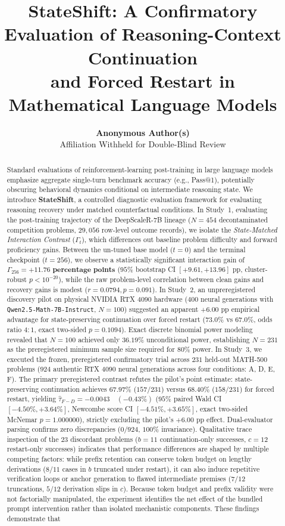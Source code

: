 \documentclass[11pt]{article}
\title{\textbf{StateShift: A Confirmatory Evaluation of Reasoning-Context Continuation\\and Forced Restart in Mathematical Language Models}}
\author{
  \textbf{Anonymous Author(s)} \\
  Affiliation Withheld for Double-Blind Review \\
}
\date{}
\begin{document}
\maketitle

\begin{abstract}
Standard evaluations of reinforcement-learning post-training in large language models emphasize aggregate single-turn benchmark accuracy (e.g., Pass@1), potentially obscuring behavioral dynamics conditional on intermediate reasoning state. We introduce \textbf{StateShift}, a controlled diagnostic evaluation framework for evaluating reasoning recovery under matched counterfactual conditions. In Study~1, evaluating the post-training trajectory of the DeepScaleR-7B lineage ($N=454$ decontaminated competition problems, $29,056$ row-level outcome records), we isolate the \emph{State-Matched Interaction Contrast} ($\Gamma_t$), which differences out baseline problem difficulty and forward proficiency gains. Between the un-tuned base model ($t=0$) and the terminal checkpoint ($t=256$), we observe a statistically significant interaction gain of $\Gamma_{256} = \mathbf{+11.76\text{ percentage points}}$ ($95\%$ bootstrap CI $[+9.61, +13.96]\text{ pp}$, cluster-robust $p < 10^{-20}$), while the raw problem-level correlation between clean gains and recovery gains is modest ($r = 0.0794, p = 0.091$). In Study~2, an unpreregistered discovery pilot on physical NVIDIA RTX 4090 hardware ($400$ neural generations with \texttt{Qwen2.5-Math-7B-Instruct}, $N=100$) suggested an apparent $+6.00\text{ pp}$ empirical advantage for state-preserving continuation over forced restart ($73.0\%$ vs $67.0\%$, odds ratio $4:1$, exact two-sided $p = 0.1094$). Exact discrete binomial power modeling revealed that $N=100$ achieved only $36.19\%$ unconditional power, establishing $N=231$ as the preregistered minimum sample size required for $80\%$ power. In Study~3, we executed the frozen, preregistered confirmatory trial across $231$ held-out MATH-500 problems ($924$ authentic RTX 4090 neural generations across four conditions: A, D, E, F). The primary preregistered contrast refutes the pilot's point estimate: state-preserving continuation achieves $67.97\%$ ($157/231$) versus $68.40\%$ ($158/231$) for forced restart, yielding $\hat{\tau}_{F-D} = \mathbf{-0.0043 \quad (-0.43\%)}$ ($95\%$ paired Wald CI $[-4.50\%, +3.64\%]$, Newcombe score CI $[-4.51\%, +3.65\%]$, exact two-sided McNemar $p = \mathbf{1.000000}$), strictly excluding the pilot's $+6.00\text{ pp}$ effect. Dual-evaluator parsing confirms zero discrepancies ($0/924$, $100\%$ invariance). Qualitative trace inspection of the $23$ discordant problems ($b=11$ continuation-only successes, $c=12$ restart-only successes) indicates that performance differences are shaped by multiple competing factors: while prefix retention can conserve token budget on lengthy derivations ($8/11$ cases in $b$ truncated under restart), it can also induce repetitive verification loops or anchor generation to flawed intermediate premises ($7/12$ truncations, $5/12$ derivation slips in $c$). Because token budget and prefix validity were not factorially manipulated, the experiment identifies the net effect of the bundled prompt intervention rather than isolated mechanistic components. These findings demonstrate that 
\end{abstract}
\end{document}
